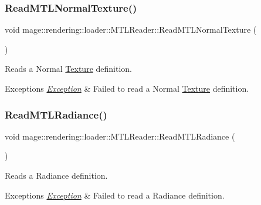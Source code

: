 \subsubsection{\texorpdfstring{Read\+M\+T\+L\+Normal\+Texture()}{ReadMTLNormalTexture()}}
{\footnotesize\ttfamily void mage\+::rendering\+::loader\+::\+M\+T\+L\+Reader\+::\+Read\+M\+T\+L\+Normal\+Texture (\begin{DoxyParamCaption}{ }\end{DoxyParamCaption})\hspace{0.3cm}{\ttfamily [private]}}

Reads a Normal \mbox{\hyperlink{classmage_1_1rendering_1_1_texture}{Texture}} definition.


\begin{DoxyExceptions}{Exceptions}
{\em \mbox{\hyperlink{classmage_1_1_exception}{Exception}}} & Failed to read a Normal \mbox{\hyperlink{classmage_1_1rendering_1_1_texture}{Texture}} definition. \\
\hline
\end{DoxyExceptions}
\mbox{\label{classmage_1_1rendering_1_1loader_1_1_m_t_l_reader_acfafc2485c4b84ef84360e35ac8247eb}} 
\subsubsection{\texorpdfstring{Read\+M\+T\+L\+Radiance()}{ReadMTLRadiance()}}
{\footnotesize\ttfamily void mage\+::rendering\+::loader\+::\+M\+T\+L\+Reader\+::\+Read\+M\+T\+L\+Radiance (\begin{DoxyParamCaption}{ }\end{DoxyParamCaption})\hspace{0.3cm}{\ttfamily [private]}}

Reads a Radiance definition.


\begin{DoxyExceptions}{Exceptions}
{\em \mbox{\hyperlink{classmage_1_1_exception}{Exception}}} & Failed to read a Radiance definition. \\
\hline
\end{DoxyExceptions}
\mbox{\label{classmage_1_1rendering_1_1loader_1_1_m_t_l_reader_a01438c92852592fd719a85d146e38b65}} 
